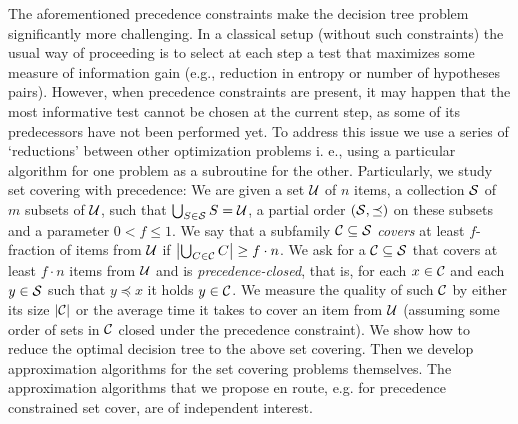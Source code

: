 The aforementioned precedence constraints make the decision tree problem significantly more challenging. In a classical setup (without such constraints) the usual way of proceeding is to select at each step a test that maximizes some measure of information gain (e.g., reduction in entropy or number of hypotheses pairs). However, when precedence constraints are present, it may happen that the most informative test cannot be chosen at the current step, as some of its predecessors have not been performed yet.
To address this issue we use a series of `reductions' between other optimization problems i. e., using a particular algorithm for one problem as a subroutine for the other.
Particularly, we study set covering with precedence:
We are given a set $\mathcal{U}$ of $n$ items, a collection $\mathcal{S}$ of $m$ subsets of $\mathcal{U}$, such that $\bigcup_{S\in\mathcal{S}}S=\mathcal{U}$, a partial order $(\mathcal{S},\preceq)$ on these subsets and a parameter $0<f\leq 1$.
We say that a subfamily $\mathcal{C}\subseteq\mathcal{S}$ \emph{covers} at least $f$-fraction of items from $\mathcal{U}$ if $\mathopen{}\left| \bigcup_{C\in\mathcal{C}}C \right|\geq f\cdot n$.
We ask for a $\mathcal{C}\subseteq\mathcal{S}$ that covers at least $f\cdot n$ items from $\mathcal{U}$ and is \emph{precedence-closed}, that is, for each $x\in\mathcal{C}$ and each $y\in\mathcal{S}$ such that $y\preceq x$ it holds $y\in\mathcal{C}$. We measure the quality of such $\mathcal{C}$ by either its size $\mathopen{}\left| \mathcal{C} \right|$ or the average time it takes to cover an item from $\mathcal{U}$ (assuming some order of sets in $\mathcal{C}$ closed under the precedence constraint). 
We show how to reduce the optimal decision tree to the above set covering. Then we develop approximation algorithms for the set covering problems themselves. The approximation algorithms that we propose en route, e.g. for precedence constrained set cover, are of independent interest.


